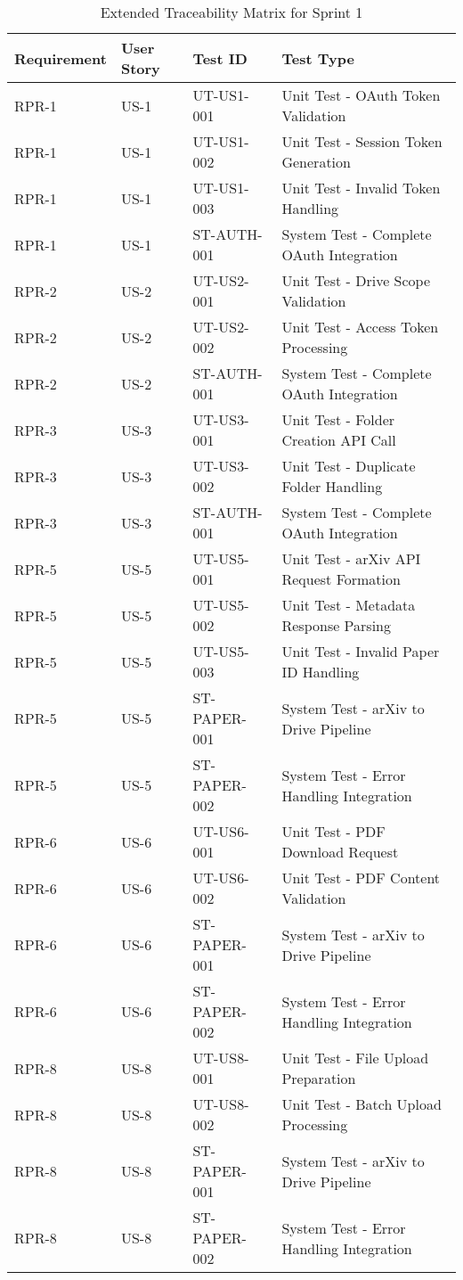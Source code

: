 \documentclass[12pt]{article}
\begin{document}
\begin{longtable}{|l|l|l|l|}
  \caption{Extended Traceability Matrix for Sprint 1}
  \label{tab:extended-traceability} \\
  \hline
  \textbf{Requirement} & \textbf{User Story} & \textbf{Test ID} & \textbf{Test Type} \\
  \hline
  RPR-1 & US-1 & UT-US1-001 & Unit Test - OAuth Token Validation \\
  RPR-1 & US-1 & UT-US1-002 & Unit Test - Session Token Generation \\
  RPR-1 & US-1 & UT-US1-003 & Unit Test - Invalid Token Handling \\
  RPR-1 & US-1 & ST-AUTH-001 & System Test - Complete OAuth Integration \\
  \hline
  RPR-2 & US-2 & UT-US2-001 & Unit Test - Drive Scope Validation \\
  RPR-2 & US-2 & UT-US2-002 & Unit Test - Access Token Processing \\
  RPR-2 & US-2 & ST-AUTH-001 & System Test - Complete OAuth Integration \\
  \hline
  RPR-3 & US-3 & UT-US3-001 & Unit Test - Folder Creation API Call \\
  RPR-3 & US-3 & UT-US3-002 & Unit Test - Duplicate Folder Handling \\
  RPR-3 & US-3 & ST-AUTH-001 & System Test - Complete OAuth Integration \\
  \hline
  RPR-5 & US-5 & UT-US5-001 & Unit Test - arXiv API Request Formation \\
  RPR-5 & US-5 & UT-US5-002 & Unit Test - Metadata Response Parsing \\
  RPR-5 & US-5 & UT-US5-003 & Unit Test - Invalid Paper ID Handling \\
  RPR-5 & US-5 & ST-PAPER-001 & System Test - arXiv to Drive Pipeline \\
  RPR-5 & US-5 & ST-PAPER-002 & System Test - Error Handling Integration \\
  \hline
  RPR-6 & US-6 & UT-US6-001 & Unit Test - PDF Download Request \\
  RPR-6 & US-6 & UT-US6-002 & Unit Test - PDF Content Validation \\
  RPR-6 & US-6 & ST-PAPER-001 & System Test - arXiv to Drive Pipeline \\
  RPR-6 & US-6 & ST-PAPER-002 & System Test - Error Handling Integration \\
  \hline
  RPR-8 & US-8 & UT-US8-001 & Unit Test - File Upload Preparation \\
  RPR-8 & US-8 & UT-US8-002 & Unit Test - Batch Upload Processing \\
  RPR-8 & US-8 & ST-PAPER-001 & System Test - arXiv to Drive Pipeline \\
  RPR-8 & US-8 & ST-PAPER-002 & System Test - Error Handling Integration \\
  \hline
\end{longtable}
\end{document}
